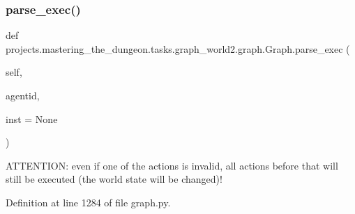 \subsubsection{\texorpdfstring{parse\+\_\+exec()}{parse\_exec()}}
{\footnotesize\ttfamily def projects.\+mastering\+\_\+the\+\_\+dungeon.\+tasks.\+graph\+\_\+world2.\+graph.\+Graph.\+parse\+\_\+exec (\begin{DoxyParamCaption}\item[{}]{self,  }\item[{}]{agentid,  }\item[{}]{inst = {\ttfamily None} }\end{DoxyParamCaption})}

\begin{DoxyVerb}ATTENTION: even if one of the actions is invalid, all actions before that will still be executed (the world state will be changed)!\end{DoxyVerb}
 

Definition at line 1284 of file graph.\+py.


